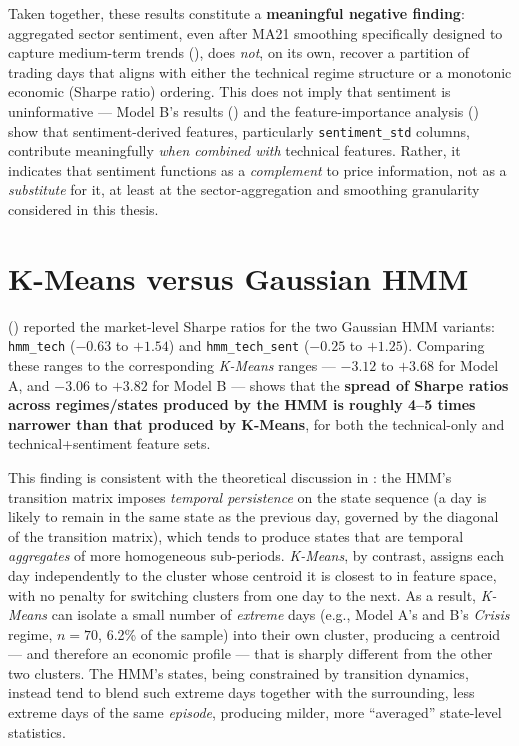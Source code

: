 Taken together, these results constitute a \textbf{meaningful negative
finding}: aggregated sector sentiment, even after MA21 smoothing
specifically designed to capture medium-term trends
(), does \emph{not}, on its own, recover a
partition of trading days that aligns with either the technical regime
structure or a monotonic economic (Sharpe ratio) ordering. This does not
imply that sentiment is uninformative --- Model B's results
() and the feature-importance analysis
() show that sentiment-derived features,
particularly \texttt{sentiment\_std} columns, contribute meaningfully
\emph{when combined with} technical features. Rather, it indicates that
sentiment functions as a \emph{complement} to price information, not as a
\emph{substitute} for it, at least at the sector-aggregation and smoothing
granularity considered in this thesis.

\section{K-Means versus Gaussian HMM}
\label{sec:results-hmm}

 () reported the
market-level Sharpe ratios for the two Gaussian HMM variants:
\texttt{hmm\_tech} ($-0.63$ to $+1.54$) and \texttt{hmm\_tech\_sent}
($-0.25$ to $+1.25$). Comparing these ranges to the corresponding
\textit{K-Means} ranges --- $-3.12$ to $+3.68$ for Model A, and $-3.06$ to
$+3.82$ for Model B --- shows that the \textbf{spread of Sharpe ratios
across regimes/states produced by the HMM is roughly 4--5 times narrower
than that produced by K-Means}, for both the technical-only and
technical+sentiment feature sets.

This finding is consistent with the theoretical discussion in
: the HMM's transition matrix imposes \emph{temporal
persistence} on the state sequence (a day is likely to remain in the same
state as the previous day, governed by the diagonal of the transition
matrix), which tends to produce states that are temporal
\emph{aggregates} of more homogeneous sub-periods. \textit{K-Means}, by
contrast, assigns each day independently to the cluster whose centroid it
is closest to in feature space, with no penalty for switching clusters
from one day to the next. As a result, \textit{K-Means} can isolate a
small number of \emph{extreme} days (e.g., Model A's and B's
\emph{Crisis} regime, $n=70$, 6.2\% of the sample) into their own cluster,
producing a centroid --- and therefore an economic profile --- that is
sharply different from the other two clusters. The HMM's states, being
constrained by transition dynamics, instead tend to blend such extreme
days together with the surrounding, less extreme days of the same
\emph{episode}, producing milder, more ``averaged'' state-level
statistics.

